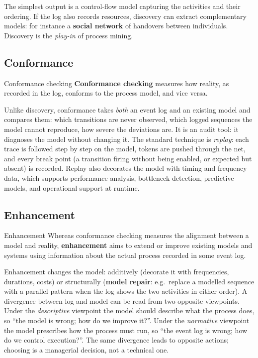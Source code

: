 The simplest output is a control-flow model capturing the activities and their ordering. If the log also records resources, discovery can extract complementary models: for instance a \textbf{social network} of handovers between individuals. Discovery is the \emph{play-in} of process mining.

\subsection{Conformance}

\begin{definitionbox}{Conformance checking}
\textbf{Conformance checking} measures how reality, as recorded in the log, conforms to the process model, and vice versa.
\end{definitionbox}

Unlike discovery, conformance takes \emph{both} an event log and an existing model and compares them: which transitions are never observed, which logged sequences the model cannot reproduce, how severe the deviations are. It is an audit tool: it diagnoses the model without changing it. The standard technique is \emph{replay}: each trace is followed step by step on the model, tokens are pushed through the net, and every break point (a transition firing without being enabled, or expected but absent) is recorded. Replay also decorates the model with timing and frequency data, which supports performance analysis, bottleneck detection, predictive models, and operational support at runtime.

\subsection{Enhancement}

\begin{definitionbox}{Enhancement}
Whereas conformance checking measures the alignment between a model and reality, \textbf{enhancement} aims to extend or improve existing models and systems using information about the actual process recorded in some event log.
\end{definitionbox}

Enhancement changes the model: additively (decorate it with frequencies, durations, costs) or structurally (\textbf{model repair}: e.g.\ replace a modelled sequence with a parallel pattern when the log shows the two activities in either order). A divergence between log and model can be read from two opposite viewpoints. Under the \emph{descriptive} viewpoint the model should describe what the process does, so ``the model is wrong; how do we improve it?''. Under the \emph{normative} viewpoint the model prescribes how the process must run, so ``the event log is wrong; how do we control execution?''. The same divergence leads to opposite actions; choosing is a managerial decision, not a technical one.

